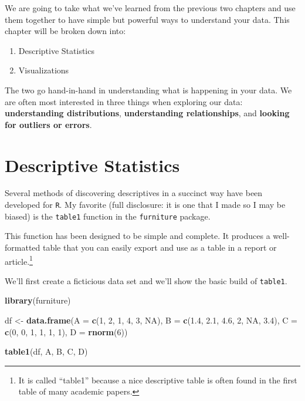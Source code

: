 \documentclass[]{tufte-book}
\newenvironment{Shaded}{}{}
\newcommand{\KeywordTok}[1]{\textcolor[rgb]{0.00,0.44,0.13}{\textbf{#1}}}
\newcommand{\DataTypeTok}[1]{\textcolor[rgb]{0.56,0.13,0.00}{#1}}
\newcommand{\DecValTok}[1]{\textcolor[rgb]{0.25,0.63,0.44}{#1}}
\newcommand{\FloatTok}[1]{\textcolor[rgb]{0.25,0.63,0.44}{#1}}
\newcommand{\StringTok}[1]{\textcolor[rgb]{0.25,0.44,0.63}{#1}}
\newcommand{\OtherTok}[1]{\textcolor[rgb]{0.00,0.44,0.13}{#1}}
\newcommand{\NormalTok}[1]{#1}
\providecommand{\tightlist}{%
  \setlength{\itemsep}{0pt}\setlength{\parskip}{0pt}}
\theoremstyle{definition}
\theoremstyle{definition}
\theoremstyle{remark}
\begin{document}
We are going to take what we've learned from the previous two chapters
and use them together to have simple but powerful ways to understand
your data. This chapter will be broken down into:

\begin{enumerate}
\def\labelenumi{\arabic{enumi}.}
\tightlist
\item
  Descriptive Statistics
\item
  Visualizations
\end{enumerate}

The two go hand-in-hand in understanding what is happening in your data.
We are often most interested in three things when exploring our data:
\textbf{understanding distributions}, \textbf{understanding
relationships}, and \textbf{looking for outliers or errors}.

\section*{Descriptive Statistics}\label{descriptive-statistics}

Several methods of discovering descriptives in a succinct way have been
developed for \texttt{R}. My favorite (full disclosure: it is one that I
made so I may be biased) is the \texttt{table1} function in the
\texttt{furniture} package.

This function has been designed to be simple and complete. It produces a
well-formatted table that you can easily export and use as a table in a
report or article.\footnote{It is called ``table1'' because a nice
  descriptive table is often found in the first table of many academic
  papers.}

We'll first create a ficticious data set and we'll show the basic build
of \texttt{table1}.

\begin{Shaded}
\begin{Highlighting}[]
\KeywordTok{library}\NormalTok{(furniture)}

\NormalTok{df <-}\StringTok{ }\KeywordTok{data.frame}\NormalTok{(}\DataTypeTok{A =} \KeywordTok{c}\NormalTok{(}\DecValTok{1}\NormalTok{, }\DecValTok{2}\NormalTok{, }\DecValTok{1}\NormalTok{, }\DecValTok{4}\NormalTok{, }\DecValTok{3}\NormalTok{, }\OtherTok{NA}\NormalTok{), }\DataTypeTok{B =} \KeywordTok{c}\NormalTok{(}\FloatTok{1.4}\NormalTok{, }
    \FloatTok{2.1}\NormalTok{, }\FloatTok{4.6}\NormalTok{, }\DecValTok{2}\NormalTok{, }\OtherTok{NA}\NormalTok{, }\FloatTok{3.4}\NormalTok{), }\DataTypeTok{C =} \KeywordTok{c}\NormalTok{(}\DecValTok{0}\NormalTok{, }\DecValTok{0}\NormalTok{, }\DecValTok{1}\NormalTok{, }\DecValTok{1}\NormalTok{, }\DecValTok{1}\NormalTok{, }
    \DecValTok{1}\NormalTok{), }\DataTypeTok{D =} \KeywordTok{rnorm}\NormalTok{(}\DecValTok{6}\NormalTok{))}

\KeywordTok{table1}\NormalTok{(df, A, B, C, D)}
\end{Highlighting}
\end{Shaded}
\end{document}
